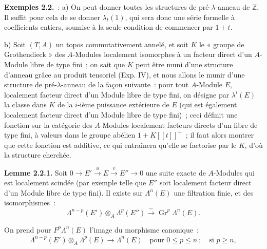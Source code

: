 \textbf{Exemples 2.2.}~: a) On peut donner toutes les structures de pré-\(\lambda\)-anneau de \(\mathbb Z\). Il suffit pour cela de se donner \(\lambda_t(1)\), qui sera donc une série formelle à coefficients entiers, soumise à la seule condition de commencer par \(1+t\).

b) Soit \((T,A)\) un topos commutativement annelé, et soit \(K\) le « groupe de Grothendieck » des \(A\)-Modules localement isomorphes à un facteur direct d'un \(A\)-Module libre de type fini~; on sait que \(K\) peut être muni d'une structure d'anneau grâce au produit tensoriel (Exp. IV), et nous allons le munir d'une structure de pré-\(\lambda\)-anneau de la façon suivante~: pour tout \(A\)-Module \(E\), localement facteur direct d'un Module libre de type fini, on désigne par \(\lambda^i(E)\) la classe dans \(K\) de la \(i\)-ième puissance extérieure de \(E\) (qui est également localement facteur direct d'un Module libre de type fini)~; ceci définit une fonction sur la catégorie des \(A\)-Modules localement facteurs directs d'un libre de type fini, à valeurs dans le groupe abélien \(1+K[[t]]^+\)~; il faut alors montrer que cette fonction est additive, ce qui entraînera qu'elle se factorise par le \(K\), d'où la structure cherchée.

\textbf{Lemme 2.2.1.} Soit \(0\longrightarrow E' \xrightarrow{u} E \xrightarrow{v} E''\longrightarrow0\) une suite exacte de \(A\)-Modules qui est localement scindée (par exemple telle que \(E''\) soit localement facteur direct d'un Module libre de type fini). Il existe sur \(\Lambda^n(E)\) une filtration finie, et des isomorphismes~:
\[
  \Lambda^{n-p}(E')\otimes_A\Lambda^p(E'')
  \xrightarrow{\sim}
  \operatorname{Gr}^p\Lambda^n(E).
\]

On prend pour \(F^p\Lambda^n(E)\) l'image du morphisme canonique~:
\[
\begin{gathered}
  \Lambda^{n-p}(E')\otimes_A\Lambda^p(E)\longrightarrow\Lambda^n(E)
  \quad\text{pour } 0\leq p\leq n\ ;\quad \text{si } p\geq n,
\end{gathered}
\]
